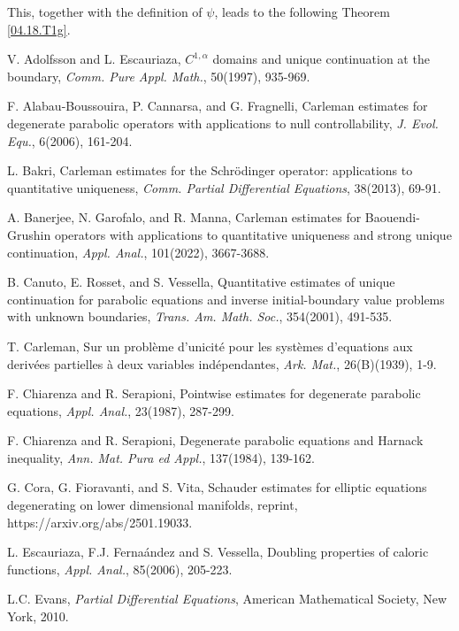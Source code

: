 \documentclass[11pt]{article}
\numberwithin{equation}{section}
\def\al{\alpha}
\begin{document}
This, together with the definition of $\psi$, leads to the following Theorem \ref{04.18.T1g}.


\begin{thebibliography}{}
	V. Adolfsson and L. Escauriaza, $C^{1,\al}$ domains and unique continuation at the boundary,
	{\it Comm. Pure Appl. Math.}, 50(1997), 935-969.
	
	F. Alabau-Boussouira, P. Cannarsa,  and G. Fragnelli, Carleman estimates for degenerate parabolic operators with applications to null controllability, {\it J. Evol. Equ.}, 6(2006), 161-204.
	
	L. Bakri, Carleman estimates for the Schr\"odinger operator: applications to quantitative uniqueness, {\it
Comm. Partial Differential Equations}, 38(2013), 69-91.
	
	A. Banerjee, N. Garofalo, and R. Manna, Carleman estimates for Baouendi-Grushin operators with applications to quantitative uniqueness and strong unique continuation,
	{\it Appl. Anal.}, 101(2022), 3667-3688.
	
	B. Canuto, E. Rosset, and S. Vessella, {Quantitative estimates of unique continuation for parabolic equations and inverse initial-boundary value problems with unknown boundaries}, {\it Trans. Am. Math. Soc.}, 354(2001), 491-535.
	
	T. Carleman, Sur un probl\`eme d'unicit\'e pour les syst\`emes d'equations aux deriv\'ees partielles \`a deux variables ind\'ependantes, {\it Ark. Mat.}, 26(B)(1939), 1-9.
	
	F. Chiarenza and R. Serapioni, Pointwise estimates for degenerate parabolic equations, {\it Appl. Anal.}, 23(1987), 287-299.
	
	F. Chiarenza and R. Serapioni, Degenerate parabolic equations and Harnack inequality, {\it Ann. Mat. Pura ed Appl.}, 137(1984), 139-162.
	
	G. Cora, G. Fioravanti, and S. Vita, Schauder estimates for elliptic equations degenerating on lower dimensional manifolds, reprint, https://arxiv.org/abs/2501.19033.
	
	L. Escauriaza, F.J. Ferna\'andez and S. Vessella, Doubling properties of caloric functions, {\it Appl. Anal.}, 85(2006), 205-223.
	
	
	L.C. Evans, {\it Partial Differential Equations}, American Mathematical Society, New York, 2010.
	

\end{thebibliography}
\end{document}
